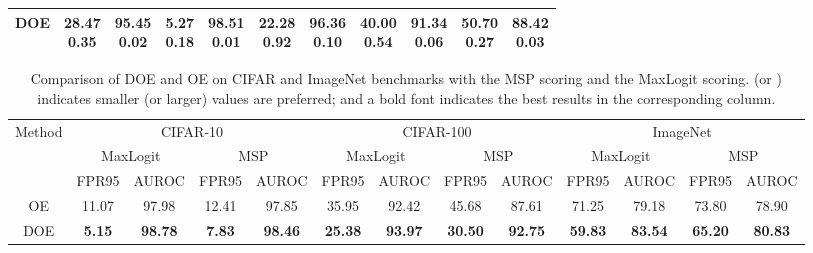 \documentclass{article} \usepackage{iclr2022_conference,times}
\begin{document}
\begin{table}[t]
{\begin{tabular}{c|cccccccccc}
DOE         & \makecell{\textbf{28.47}\\\textbf{0.35}} & \makecell{\textbf{95.45}\\\textbf{0.02}} & \makecell{\textbf{5.27}\\\textbf{0.18}} & \makecell{\textbf{98.51}\\\textbf{0.01}} & \makecell{\textbf{22.28}\\\textbf{0.92}} & \makecell{\textbf{96.36}\\\textbf{0.10}} & \makecell{\textbf{40.00}\\\textbf{0.54}} & \makecell{\textbf{91.34}\\\textbf{0.06}} & \makecell{\textbf{50.70}\\\textbf{0.27}} & \makecell{\textbf{88.42}\\\textbf{0.03}} \\
\bottomrule[1.5pt]   
\end{tabular}}
\end{table}

\begin{table}[t]
\caption{{Comparison of DOE and OE on CIFAR and ImageNet benchmarks with the MSP scoring and the MaxLogit scoring.  (or ) indicates smaller (or larger) values are preferred; and a bold font indicates the best results in the corresponding column.} }  \label{tab: mspvsml}
\centering
\resizebox{\columnwidth}{!}
{
\centering
\begin{tabular}{c|cc|cc|cc|cc|cc|cc}
\toprule[1.5pt]
\multirow{3}{*}{Method}         & \multicolumn{4}{c|}{CIFAR-10}                                                              & \multicolumn{4}{c|}{CIFAR-100}  & \multicolumn{4}{c}{ImageNet}                                                             \\
\cline{2-13}
                          & \multicolumn{2}{c|}{MaxLogit}                & \multicolumn{2}{c|}{MSP}                     & \multicolumn{2}{c|}{MaxLogit}                & \multicolumn{2}{c|}{MSP}  & \multicolumn{2}{c|}{MaxLogit}                & \multicolumn{2}{c}{MSP}                     \\
                          & FPR95                    & AUROC                   &FPR95                    & AUROC                   & FPR95                    & AUROC                   & FPR95                   & AUROC  & FPR95                   & AUROC  & FPR95                   & AUROC                  \\ \midrule[1pt]
OE & 11.07 & 97.98 & 12.41 & 97.85 & 35.95 & 92.42 & 45.68 & 87.61 & 71.25 & 79.18 & 73.80 & 78.90 \\
DOE& \textbf{5.15}  & \textbf{98.78} & \textbf{7.83}  & \textbf{98.46} & \textbf{25.38} & \textbf{93.97} & \textbf{30.50} & \textbf{92.75} & \textbf{59.83} & \textbf{83.54} & \textbf{65.20} & \textbf{80.83}\\
\bottomrule[1.5pt]  
\end{tabular}}
\end{table}
\end{document}
